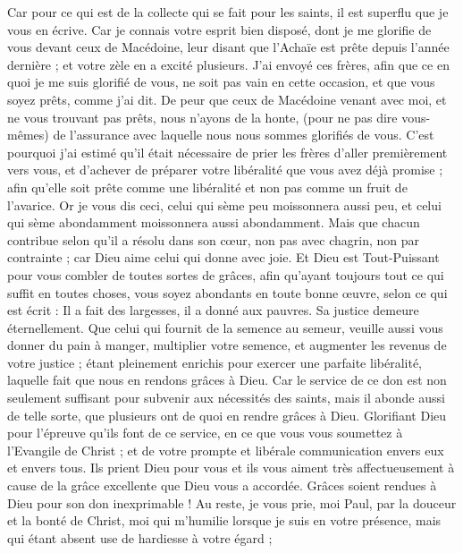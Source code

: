 \begin{multicols}{2}
\VerseOne{}Car pour ce qui est de la collecte qui se fait pour les saints, il est superflu que je vous en écrive.
Car je connais votre esprit bien disposé, dont je me glorifie de vous devant ceux de Macédoine, leur disant que l'Achaïe est prête depuis l'année dernière ; et votre zèle en a excité plusieurs.
J'ai envoyé ces frères, afin que ce en quoi je me suis glorifié de vous, ne soit pas vain en cette occasion, et que vous soyez prêts, comme j'ai dit.
De peur que ceux de Macédoine venant avec moi, et ne vous trouvant pas prêts, nous n'ayons de la honte, (pour ne pas dire vous-mêmes) de l'assurance avec laquelle nous nous sommes glorifiés de vous.
C'est pourquoi j'ai estimé qu'il était nécessaire de prier les frères d'aller premièrement vers vous, et d'achever de préparer votre libéralité que vous avez déjà promise ; afin qu'elle soit prête comme une libéralité et non pas comme un fruit de l'avarice.
Or je vous dis ceci, celui qui sème peu moissonnera aussi peu, et celui qui sème abondamment moissonnera aussi abondamment.
Mais que chacun contribue selon qu'il a résolu dans son cœur, non pas avec chagrin, non par contrainte ; car Dieu aime celui qui donne avec joie.
Et Dieu est Tout-Puissant pour vous combler de toutes sortes de grâces, afin qu'ayant toujours tout ce qui suffit en toutes choses, vous soyez abondants en toute bonne œuvre,
selon ce qui est écrit : Il a fait des largesses, il a donné aux pauvres. Sa justice demeure éternellement.
Que celui qui fournit de la semence au semeur, veuille aussi vous donner du pain à manger, multiplier votre semence, et augmenter les revenus de votre justice ;
étant pleinement enrichis pour exercer une parfaite libéralité, laquelle fait que nous en rendons grâces à Dieu.
Car le service de ce don est non seulement suffisant pour subvenir aux nécessités des saints, mais il abonde aussi de telle sorte, que plusieurs ont de quoi en rendre grâces à Dieu.
Glorifiant Dieu pour l'épreuve qu'ils font de ce service, en ce que vous vous soumettez à l'Evangile de Christ ; et de votre prompte et libérale communication envers eux et envers tous.
Ils prient Dieu pour vous et ils vous aiment très affectueusement à cause de la grâce excellente que Dieu vous a accordée.
Grâces soient rendues à Dieu pour son don inexprimable !
\VerseOne{}Au reste, je vous prie, moi Paul, par la douceur et la bonté de Christ, moi qui m'humilie lorsque je suis en votre présence, mais qui étant absent use de hardiesse à votre égard ;

\end{multicols}
